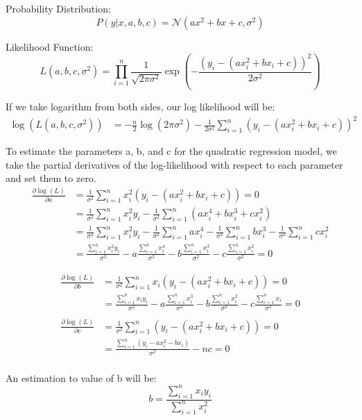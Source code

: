 \documentclass{article}
\begin{document}
Probability Distribution:
\[
P(y | x, a, b, c) = \mathcal{N}(ax^2 + bx + c, \sigma^2)
\]

Likelihood Function:
\[
L(a, b, c, \sigma^2) = \prod_{i=1}^n \frac{1}{\sqrt{2\pi\sigma^2}} \exp\left(-\frac{(y_i - (ax_i^2 + bx_i + c))^2}{2\sigma^2}\right)
\]

If we take logarithm from both sides, our log likelihood will be:
\[
\begin{aligned}
\log(L(a, b, c, \sigma^2)) &= -\frac{n}{2} \log(2\pi\sigma^2) - \frac{1}{2\sigma^2} \sum_{i=1}^n (y_i - (ax_i^2 + bx_i + c))^2
\end{aligned}
\]

To estimate the parameters a, b, and c for the quadratic regression model, we take the partial derivatives of the log-likelihood with respect to each parameter and set them to zero.
\[
\begin{aligned}
\frac{\partial \log(L)}{\partial a} &= \frac{1}{\sigma^2} \sum_{i=1}^n x_i^2(y_i - (ax_i^2 + bx_i + c)) = 0 \\
&= \frac{1}{\sigma^2} \sum_{i=1}^{n} x_i^2y_i - \frac{1}{\sigma^2} \sum_{i=1}^{n} (ax_i^4 + bx_i^3 + cx_i^2) \\
&= \frac{1}{\sigma^2} \sum_{i=1}^n x_i^2y_i - \frac{1}{\sigma^2} \sum_{i=1}^n ax_i^4 - \frac{1}{\sigma^2} \sum_{i=1}^n bx_i^3 - \frac{1}{\sigma^2} \sum_{i=1}^n cx_i^2 \\
&= \frac{\sum_{i=1}^n x_i^2y_i}{\sigma^2} - a\frac{\sum_{i=1}^n x_i^4}{\sigma^2} - b\frac{\sum_{i=1}^n x_i^3}{\sigma^2} - c\frac{\sum_{i=1}^n x_i^2}{\sigma^2} = 0
\end{aligned}
\]


\[
\begin{aligned}
\frac{\partial \log(L)}{\partial b} &= \frac{1}{\sigma^2} \sum_{i=1}^n x_i(y_i - (ax_i^2 + bx_i + c)) = 0 \\
&= \frac{\sum_{i=1}^n x_iy_i}{\sigma^2} - a\frac{\sum_{i=1}^n x_i^3}{\sigma^2} - b\frac{\sum_{i=1}^n x_i^2}{\sigma^2} - c\frac{\sum_{i=1}^n x_i}{\sigma^2} = 0 \\\\
\frac{\partial \log(L)}{\partial c} &= \frac{1}{\sigma^2} \sum_{i=1}^n (y_i - (ax_i^2 + bx_i + c)) = 0 \\
&= \frac{\sum_{i=1}^n (y_i - ax_i^2 - bx_i)}{\sigma^2} - nc = 0 \\
\end{aligned}
\]

An estimation to value of b will be:
\[
b = \frac{\sum_{i=1}^n x_iy_i}{\sum_{i=1}^n x_i^2}
\]
\end{document}
